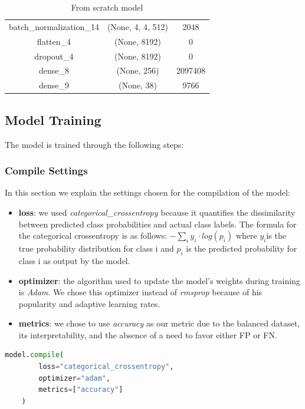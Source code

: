 \begin{table}[h]
\begin{tabular}{ccc}
	batch\_normalization\_14      & (None, 4, 4, 512)         & 2048                 \\ 
	flatten\_4                    & (None, 8192)              & 0                    \\ 
	dropout\_4                    & (None, 8192)              & 0                    \\ 
	dense\_8                      & (None, 256)               & 2097408              \\ 
	dense\_9                      & (None, 38)                & 9766                 \\ 
	\hline
	\end{tabular}
	\caption{From scratch model}
	\label{tab:model_details}
\end{table}

\subsection{Model Training}

The model is trained through the following steps:

\subsubsection{Compile Settings}
In this section we explain the settings chosen for the compilation of the model:
\begin{itemize}
	\item \textbf{loss}: we used \textit{categorical\_crossentropy} because it quantifies the dissimilarity 
		between predicted class probabilities and actual class labels. The formula for the categorical crossentropy
		is as follows: $-\sum_i{y_i \cdot log(p_i)}$ where $y_i$is the true probability distribution for class i and 
		$p_i$ is the predicted probability for class i as output by the model.
	\item \textbf{optimizer}: the algorithm used to update the model's weights during training is \textit{Adam}. We chose 
		this optimizer instead of \textit{rmsprop} because of his popularity and adaptive learning rates.
	\item \textbf{metrics}: we chose to use \textit{accuracy} as our metric due to the balanced dataset, its interpretability, 
		and the absence of a need to favor either FP or FN.
\end{itemize}

\begin{lstlisting}[language=Python]
	model.compile(
		loss="categorical_crossentropy",
		optimizer="adam",
		metrics=["accuracy"]
	)
\end{lstlisting}

